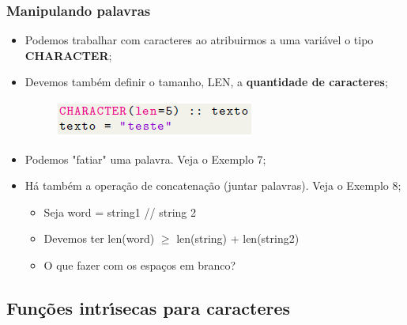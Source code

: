 \documentclass[xcolor=table]{beamer}
\newenvironment{stepitemize}{\begin{itemize}[<+->]}{\end{itemize} }
\begin{document}
\begin{frame}%

\frametitle{Manipulando palavras}

\begin{stepitemize}
\item Podemos trabalhar com caracteres ao atribuirmos a uma vari\'{a}vel o
tipo \textbf{CHARACTER};

\item Devemos tamb\'{e}m definir o tamanho, LEN, a \textbf{quantidade de
caracteres};%

\begin{figure}
	\includegraphics{./figCharacLen}
\end{figure}

\item Podemos "fatiar" uma palavra. Veja o Exemplo 7;

\item H\'{a} tamb\'{e}m a opera\c{c}\~{a}o de concatena\c{c}\~{a}o (juntar
palavras). Veja o Exemplo 8;

\begin{itemize}
\item Seja word = string1 // string 2

\item Devemos ter len(word) $\geqslant $ len(string) + len(string2)

\item O que fazer com os espa\c{c}os em branco?
\end{itemize}
\end{stepitemize}

\transboxout%
\end{frame}%

\subsection{Fun\c{c}\~{o}es intr\'{\i}secas para caracteres}
\end{document}
